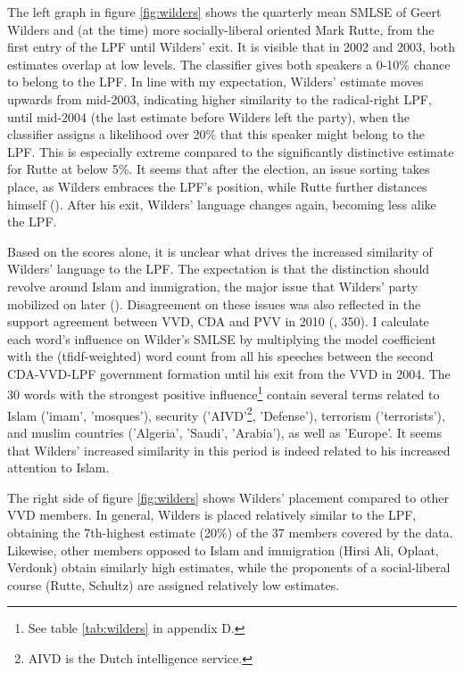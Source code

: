 \documentclass{article}
\begin{document}
The left graph in figure \ref{fig:wilders} shows the quarterly mean SMLSE of Geert Wilders and (at the time) more socially-liberal oriented Mark Rutte, from the first entry of the LPF until Wilders' exit. It is visible that in 2002 and 2003, both estimates overlap at low levels. The classifier gives both speakers a 0-10\% chance to belong to the LPF. In line with my expectation, Wilders' estimate moves upwards from mid-2003, indicating higher similarity to the radical-right LPF, until mid-2004 (the last estimate before Wilders left the party), when the classifier assigns a likelihood over 20\% that this speaker might belong to the LPF. This is especially extreme compared to the significantly distinctive estimate for Rutte at below 5\%. It seems that after the election, an issue sorting takes place, as Wilders embraces the LPF's position, while Rutte further distances himself (\cite{Carmines1986}). After his exit, Wilders' language changes again, becoming less alike the LPF.\par

Based on the scores alone, it is unclear what drives the increased similarity of Wilders' language to the LPF. The expectation is that the distinction should revolve around Islam and immigration, the major issue that Wilders' party mobilized on later (\cite{VanHolsteyn2011}). Disagreement on these issues was also reflected in the support agreement between VVD, CDA and PVV in 2010 (\cite{Otjes2014}, 350). I calculate each word's influence on Wilder's SMLSE  by multiplying the model coefficient with the (tfidf-weighted) word count from all his speeches between the second CDA-VVD-LPF government formation until his exit from the VVD in 2004. The 30 words with the strongest positive influence\footnote{See table \ref{tab:wilders} in appendix D.} contain several terms related to Islam ('imam', 'mosques'), security ('AIVD'\footnote{AIVD is the Dutch intelligence service.}, 'Defense'), terrorism ('terrorists'), and muslim countries ('Algeria', 'Saudi', 'Arabia'), as well as 'Europe'. It seems that Wilders' increased similarity in this period is indeed related to his increased attention to Islam.\par

The right side of figure \ref{fig:wilders} shows Wilders' placement compared to other VVD members. In general, Wilders is placed relatively similar to the LPF, obtaining the 7th-highest estimate (20\%) of the 37 members covered by the data. Likewise, other members opposed to Islam and immigration (Hirsi Ali, Oplaat, Verdonk) obtain similarly high estimates, while the proponents of a social-liberal course (Rutte, Schultz) are assigned relatively low estimates.\par
\end{document}
